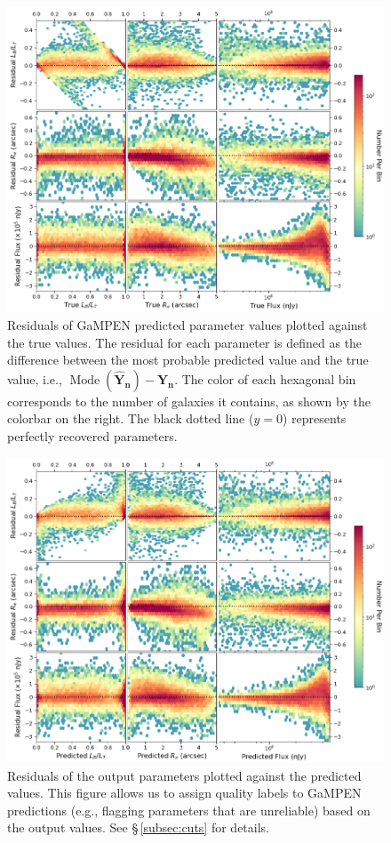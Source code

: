 \documentclass[twocolumn]{aastex63}
\newcommand\gampen{GaMPEN}
\begin{document}
\begin{CJK*}{UTF8}{gbsn}
\begin{figure}[htb]
    \centering
    \includegraphics[width
    =\textwidth]{2d_hist_residuals.png}
    \caption{Residuals of \gampen{} predicted parameter values plotted against the true values. The residual for each parameter is defined as the difference between the most probable predicted value and the true value, i.e., $\operatorname{Mode}(\boldsymbol{\hat{Y}_n}) - \boldsymbol{Y_n}$. The color of each hexagonal bin corresponds to the number of galaxies it contains, as shown by the colorbar on the right. The black dotted line ($y=0$) represents %
    perfectly recovered parameters.}
    \label{fig:2d_residual_hists}
\end{figure}

\begin{figure}[htb]
    \centering
    \includegraphics[width
    =\textwidth]{2d_hist_residuals_preds.png}
    \caption{Residuals of the output parameters plotted against the predicted values. This figure allows us to assign quality labels to \gampen{} predictions (e.g., flagging parameters that are unreliable) based on the output values. See \S\,\ref{subsec:cuts} for details.}
    \label{fig:2d_residual_hists_pred}
\end{figure}


\end{CJK*}
\end{document}
